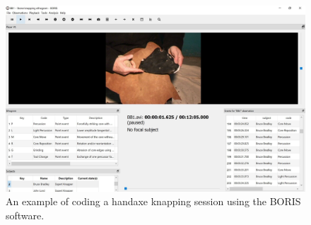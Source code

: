 \documentclass[
  11pt,
  letterpaper,
  DIV=11,
  numbers=noendperiod]{scrartcl}
\begin{document}
\begin{figure}[H]

{\centering \includegraphics[width=1\textwidth,height=\textheight]{../figure/Fig2.jpg}

}

\caption{An example of coding a handaxe knapping session using the BORIS
software.}

\end{figure}%
\end{document}
